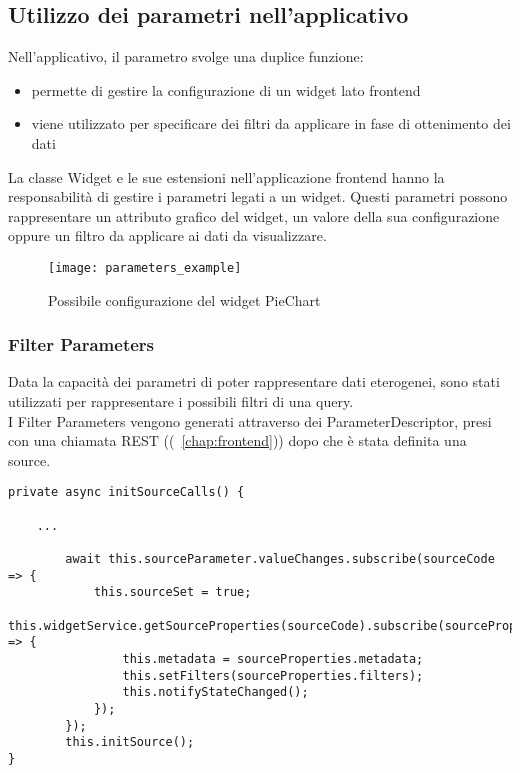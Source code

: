 \subsection{Utilizzo dei parametri nell'applicativo}
Nell'applicativo, il parametro svolge una duplice funzione:
\begin{itemize}
\item permette di gestire la configurazione di un widget lato frontend
\item viene utilizzato per specificare dei filtri da applicare in fase di ottenimento dei dati
\end{itemize}
La classe Widget e le sue estensioni nell'applicazione frontend hanno la responsabilità di gestire i parametri legati a un widget. Questi parametri possono rappresentare un attributo grafico del widget, un valore della sua configurazione oppure un filtro da applicare ai dati da visualizzare.
\begin{figure}[h!]
\begin{center}
\texttt{[image: parameters\_example]}\\
\caption{Possibile configurazione del widget PieChart}
\end{center}
\end{figure}
\subsubsection{Filter Parameters}
Data la capacità dei parametri di poter rappresentare dati eterogenei, sono stati utilizzati per rappresentare i possibili filtri di una query.\\
I Filter Parameters vengono generati attraverso dei ParameterDescriptor, presi con una chiamata REST ((~\ref{chap:frontend})) dopo che è stata definita una source.
\begin{lstlisting}[caption={initSourceCalls, base-widget.ts},style=javascriptCode]
private async initSourceCalls() {

	...
	
        await this.sourceParameter.valueChanges.subscribe(sourceCode => {
            this.sourceSet = true;
            this.widgetService.getSourceProperties(sourceCode).subscribe(sourceProperties => {
                this.metadata = sourceProperties.metadata;
                this.setFilters(sourceProperties.filters);
                this.notifyStateChanged();
            });
        });
        this.initSource();
}
\end{lstlisting}